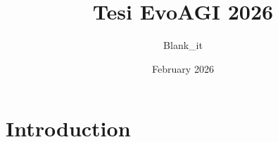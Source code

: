 \documentclass{article}
\title{Tesi EvoAGI 2026}
\author{Blank\_it }
\date{February 2026}
\begin{document}
\maketitle

\section{Introduction}
\end{document}
